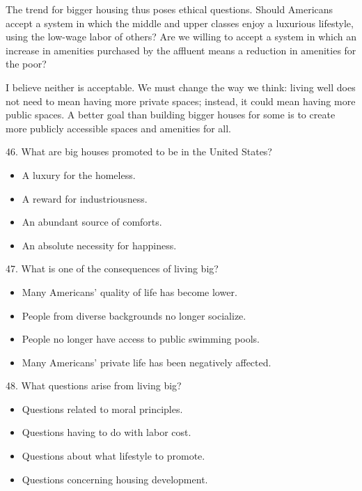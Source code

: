 \documentclass[UTF8,11pt]{ctexart}
\begin{document}
The trend for bigger housing thus poses ethical questions. Should Americans accept a system in which the middle and upper classes enjoy a luxurious lifestyle, using the low-wage labor of others? Are we willing to accept a system in which an increase in amenities purchased by the affluent means a reduction in amenities for the poor?


I believe neither is acceptable. We must change the way we think: living well does not need to mean having more private spaces; instead, it could mean having more public spaces. A better goal than building bigger houses for some is to create more publicly accessible spaces and amenities for all.


46. What are big houses promoted to be in the United States?


\begin{itemize}[leftmargin=2em,itemsep=.2em,topsep=.4em]\item[A.] A luxury for the homeless.
\item[B.] A reward for industriousness.
\item[C.] An abundant source of comforts.
\item[D.] An absolute necessity for happiness.
\end{itemize}

47. What is one of the consequences of living big?


\begin{itemize}[leftmargin=2em,itemsep=.2em,topsep=.4em]\item[A.] Many Americans’ quality of life has become lower.
\item[B.] People from diverse backgrounds no longer socialize.
\item[C.] People no longer have access to public swimming pools.
\item[D.] Many Americans’ private life has been negatively affected.
\end{itemize}

48. What questions arise from living big?


\begin{itemize}[leftmargin=2em,itemsep=.2em,topsep=.4em]\item[A.] Questions related to moral principles.
\item[B.] Questions having to do with labor cost.
\item[C.] Questions about what lifestyle to promote.
\item[D.] Questions concerning housing development.
\end{itemize}
\end{document}
